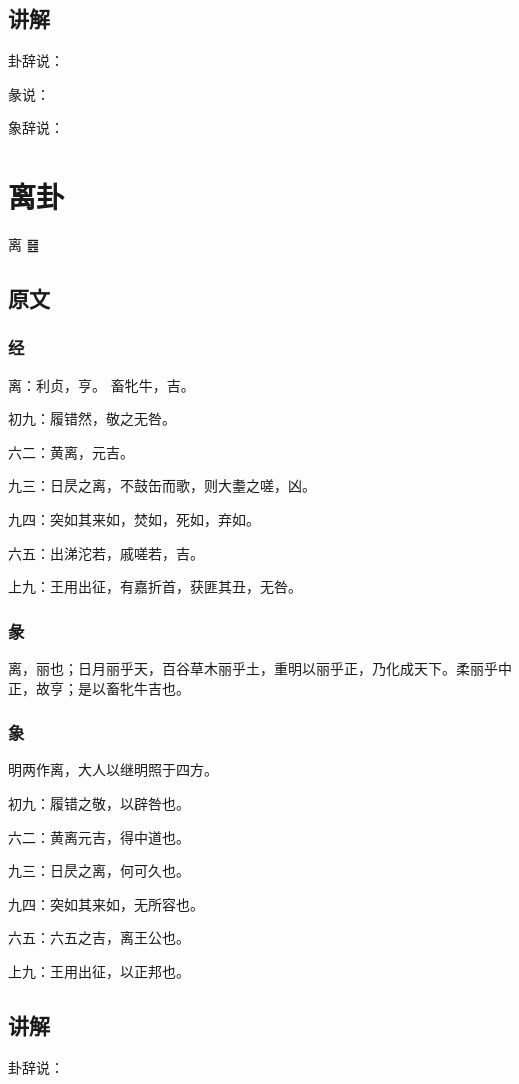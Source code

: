 \documentclass[12pt,oneside]{book}
\begin{document}
\section{讲解}
卦辞说：

彖说：

象辞说：

\chapter{离卦}
离 {\Large ䷝}

\section{原文}


\subsection{经}
离：利贞，亨。 畜牝牛，吉。

初九：履错然，敬之无咎。

六二：黄离，元吉。

九三：日昃之离，不鼓缶而歌，则大耋之嗟，凶。

九四：突如其来如，焚如，死如，弃如。

六五：出涕沱若，戚嗟若，吉。

上九：王用出征，有嘉折首，获匪其丑，无咎。

\subsection{彖}
离，丽也；日月丽乎天，百谷草木丽乎土，重明以丽乎正，乃化成天下。柔丽乎中正，故亨；是以畜牝牛吉也。

\subsection{象}
明两作离，大人以继明照于四方。

初九：履错之敬，以辟咎也。

六二：黄离元吉，得中道也。

九三：日昃之离，何可久也。

九四：突如其来如，无所容也。

六五：六五之吉，离王公也。

上九：王用出征，以正邦也。

\section{讲解}
卦辞说：
\end{document}
